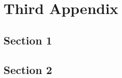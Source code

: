 \chapter{Third Appendix}\label{app:}
  \section{Section 1}\label{sec:}
    
  \section{Section 2}\label{sec:}
    